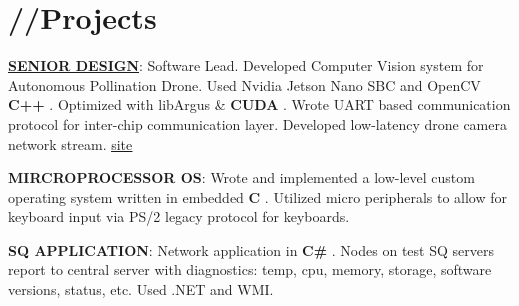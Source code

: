 \documentclass[10pt, letterpaper]{article}
\newcommand{\emphasis}[1]{
    \textcolor{purduegold}{\textbf{#1}}
}
\newcommand{\Emphasis}[1]{\uppercase{\textbf{#1}}}
\begin{document}
  \section*{\huge //Projects}
    \begin{enumerate}[label={[\arabic*]}]
        \setcounter{enumi}{-1}
        \item \href{https://jpanos.github.io/ECE-477/}{\Emphasis{Senior Design}}: {Software Lead}. Developed Computer Vision system for Autonomous Pollination Drone. Used Nvidia Jetson Nano SBC and OpenCV \emphasis{C++}. Optimized with {libArgus} \& \emphasis{CUDA}. Wrote UART based communication protocol for inter-chip communication layer. Developed low-latency drone camera network stream. \href{https://jpanos.github.io/ECE-477/}{\underline{site}}
        \item \Emphasis{Mircroprocessor OS}: Wrote and implemented a low-level custom operating system written in embedded \emphasis{C}. Utilized micro peripherals to allow for keyboard input via PS/2 legacy protocol for keyboards.
        \item \Emphasis{SQ Application}: Network application in \emphasis{C\#}. Nodes on test SQ servers report to central server with diagnostics: temp, cpu, memory, storage, software versions, status, etc. Used .NET and WMI.

    \end{enumerate}
\end{document}
